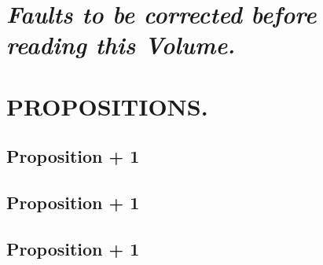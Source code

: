 		\newpage
		{\centering\section[CORRIGENDA.]{\textit{Faults to be corrected before reading this Volume.}}
		\label{section\thesection}}
		\clearpage
        \setcounter{page}{1}
		{\centering\section{PROPOSITIONS.}
		\label{section\thesection}}

		\subsection{Proposition \the\numexpr \theprop + 1}
		
		\clearpage
		\subsection{Proposition \the\numexpr \theprop + 1}
		
		\clearpage
		\subsection{Proposition \the\numexpr \theprop + 1}
		
		\clearpage
